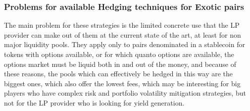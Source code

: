\documentclass{article}
\begin{document}
\subsubsection{Problems for available Hedging techniques for Exotic pairs}
The main problem for these strategies is the limited concrete use that the LP provider can make out of them at the current state of the art, at least for non major liquidity pools.
They apply only to pairs denominated in a stablecoin for tokens with options available, or for which quanto options are available, the options market must be liquid both in and out of the money, and because of these reasons, the pools which can effectively be hedged in this way are the biggest ones, which also offer the lowest fees, which may be interesting for big players who have complex risk and portfolio volatility mitigation strategies, but not for the LP provider who is looking for yield generation.
\end{document}
